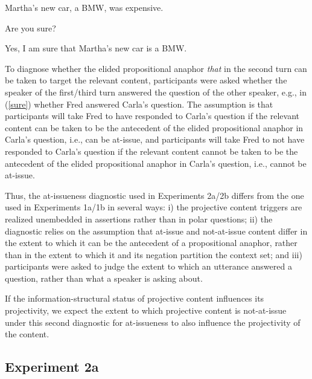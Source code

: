\documentclass[11pt,fleqn]{article}
\newcommand{\6}{\mbox{$[\hspace*{-.6mm}[$}}
\newcommand{\9}{\mbox{$]\hspace*{-.6mm}]$}}
\begin{document}
\begin{exe}
\ex\label{sure} 
\begin{xlist}
 Martha’s new car, a BMW, was expensive.

 Are you sure?

 Yes, I am sure that Martha's new car is a BMW.
\end{xlist}

%
%
%
\end{exe}
To diagnose whether the elided propositional anaphor {\em that} in the second turn can be taken to target the relevant content, participants were asked whether the speaker of the first/third turn answered the question of the other speaker, e.g., in (\ref{sure}) whether Fred answered Carla's question. The assumption is that participants will take Fred to have responded to Carla's question if the relevant content can be taken to be the antecedent of the elided propositional anaphor in Carla's question, i.e., can be at-issue, and participants will take Fred to not have responded to Carla's question if the relevant content cannot be taken to be the antecedent of the elided propositional anaphor in  Carla's question, i.e., cannot be at-issue.

Thus, the at-issueness diagnostic used in Experiments 2a/2b differs from the one used in Experiments 1a/1b in several ways: i) the projective content triggers are realized unembedded in assertions rather than in polar questions; ii) the diagnostic relies on the assumption that at-issue and not-at-issue content differ in the extent to which it can be the antecedent of a propositional anaphor, rather than in the extent to which it and its negation partition the context set; and iii) participants were asked to judge the extent to which an utterance answered a question, rather than what a speaker is asking about.

If the information-structural status of projective content influences its projectivity, we expect the extent to which projective content is not-at-issue under this second diagnostic for at-issueness to also influence the projectivity of the content.

\subsection{Experiment 2a}
\end{document}
